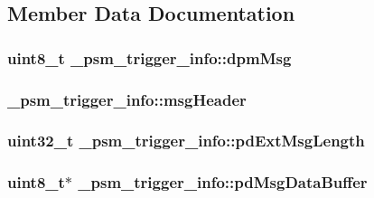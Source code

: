 \subsection{Member Data Documentation}
\hypertarget{struct__psm__trigger__info_ad7f05d06a3113ff4fa5ea1cb6cc0cf83}{
\subsubsection[{dpm\-Msg}]{\setlength{\rightskip}{0pt plus 5cm}uint8\-\_\-t \-\_\-psm\-\_\-trigger\-\_\-info\-::dpm\-Msg}}\label{struct__psm__trigger__info_ad7f05d06a3113ff4fa5ea1cb6cc0cf83}
\hypertarget{struct__psm__trigger__info_a2d5eac633a3f806ce33111067b23c6df}{
\subsubsection[{msg\-Header}]{ \-\_\-psm\-\_\-trigger\-\_\-info\-::msg\-Header}}\label{struct__psm__trigger__info_a2d5eac633a3f806ce33111067b23c6df}
\hypertarget{struct__psm__trigger__info_af56dc6655fd68a5ff26971f036d93383}{
\subsubsection[{pd\-Ext\-Msg\-Length}]{\setlength{\rightskip}{0pt plus 5cm}uint32\-\_\-t \-\_\-psm\-\_\-trigger\-\_\-info\-::pd\-Ext\-Msg\-Length}}\label{struct__psm__trigger__info_af56dc6655fd68a5ff26971f036d93383}
\hypertarget{struct__psm__trigger__info_ab8dad32f7d50d933824c9ea766850ab8}{
\subsubsection[{pd\-Msg\-Data\-Buffer}]{\setlength{\rightskip}{0pt plus 5cm}uint8\-\_\-t$\ast$ \-\_\-psm\-\_\-trigger\-\_\-info\-::pd\-Msg\-Data\-Buffer}}\label{struct__psm__trigger__info_ab8dad32f7d50d933824c9ea766850ab8}
